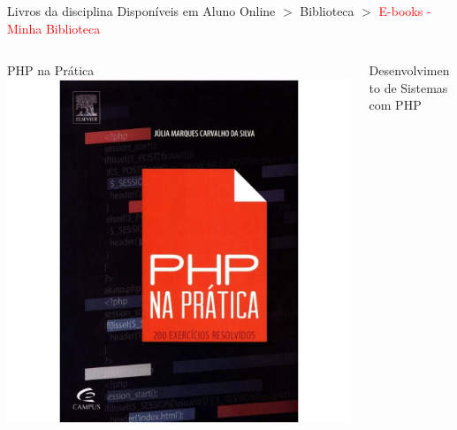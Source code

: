\documentclass{beamer}
\begin{document}
\begin{frame}{Livros da disciplina}
Disponíveis em Aluno Online $>$ Biblioteca $>$ \textcolor{red}{E-books - Minha Biblioteca} 
\begin{columns}
    \begin{column}{0.4\textwidth}
    \center
    PHP na Prática\\
     \includegraphics[height=0.5\paperheight]{fig/aula1/silva2016php.png} \\
     \cite{silva2016php}
    \end{column}
    \begin{column}{0.4\textwidth}
    \center
    Desenvolvimento de Sistemas com PHP\\

\end{column}
\end{columns}
\end{frame}
\end{document}

